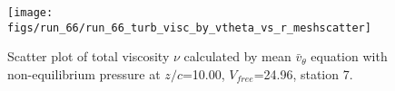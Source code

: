 \begin{figure}[H]
\centering
\texttt{[image: figs/run\_66/run\_66\_turb\_visc\_by\_vtheta\_vs\_r\_meshscatter]}
\caption{Scatter plot of total viscosity $\nu$ calculated by mean $\bar{v}_{\theta}$ equation with non-equilibrium pressure at $z/c$=10.00, $V_{free}$=24.96, station 7.}
\label{fig:run_66_turb_visc_by_vtheta_vs_r_meshscatter}
\end{figure}


